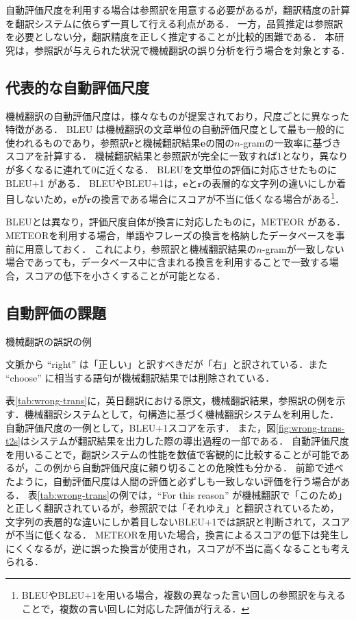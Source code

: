 \documentclass[japanese]{jnlp_1.4}
\begin{document}
自動評価尺度を利用する場合は参照訳を用意する必要があるが，翻訳精度の計算を翻訳システムに依らず一貫して行える利点がある．
一方，品質推定は参照訳を必要としない分，翻訳精度を正しく推定することが比較的困難である．
本研究は，参照訳が与えられた状況で機械翻訳の誤り分析を行う場合を対象とする．


\subsection{代表的な自動評価尺度}

機械翻訳の自動評価尺度は，様々なものが提案されており，尺度ごとに異なった特徴がある．
BLEU \cite{papineni02bleu}は機械翻訳の文章単位の自動評価尺度として最も一般的に使われるものであり，参照訳$\boldsymbol{r}$と機械翻訳結果$\boldsymbol{e}$の間の$n$-gramの一致率に基づきスコアを計算する．
機械翻訳結果と参照訳が完全に一致すれば1となり，異なりが多くなるに連れて0に近くなる．
BLEUを文単位の評価に対応させたものにBLEU+1 \cite{lin04orange}がある．
BLEUやBLEU+1は，$\boldsymbol{e}$と$\boldsymbol{r}$の表層的な文字列の違いにしか着目しないため，$\boldsymbol{e}$が$\boldsymbol{r}$の換言である場合にスコアが不当に低くなる場合がある\footnote{BLEUやBLEU+1を用いる場合，複数の異なった言い回しの参照訳を与えることで，複数の言い回しに対応した評価が行える．}．

BLEUとは異なり，評価尺度自体が換言に対応したものに，METEOR \cite{banerjee05meteor}がある．
METEORを利用する場合，単語やフレーズの換言を格納したデータベースを事前に用意しておく．
これにより，参照訳と機械翻訳結果の$n$-gramが一致しない場合であっても，データベース中に含まれる換言を利用することで一致する場合，スコアの低下を小さくすることが可能となる．


\subsection{自動評価の課題}

\begin{table}[b]
\caption{機械翻訳の誤訳の例}
\label{tab:wrong-trans}

\vspace{4pt}\small
文脈から ``right'' は「正しい」と訳すべきだが「右」と訳されている．また ``choose'' に相当する語句が機械翻訳結果では削除されている．
\end{table}

表\ref{tab:wrong-trans}に，英日翻訳における原文，機械翻訳結果，参照訳の例を示す．機械翻訳システムとして，句構造に基づく機械翻訳システムを利用した．
自動評価尺度の一例として，BLEU+1スコアを示す．
また，図\ref{fig:wrong-trans-t2s}はシステムが翻訳結果を出力した際の導出過程の一部である．
自動評価尺度を用いることで，翻訳システムの性能を数値で客観的に比較することが可能であるが，この例から自動評価尺度に頼り切ることの危険性も分かる．
前節で述べたように，自動評価尺度は人間の評価と必ずしも一致しない評価を行う場合がある．
表\ref{tab:wrong-trans}の例では，``For this reason'' が機械翻訳で「このため」と正しく翻訳されているが，参照訳では「それゆえ」と翻訳されているため，
文字列の表層的な違いにしか着目しないBLEU+1では誤訳と判断されて，スコアが不当に低くなる．
METEORを用いた場合，換言によるスコアの低下は発生しにくくなるが，逆に誤った換言が使用され，スコアが不当に高くなることも考えられる．
\end{document}
